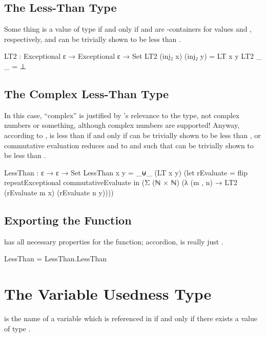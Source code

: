 \documentclass{report}
\begin{document}
\subsection{The  Less-Than Type}
Some thing is a value of type    if and only if  and  are -containers for values  and , respectively, and  can be trivially shown to be less than .

\begin{code}
  LT2 : Exceptional ε → Exceptional ε → Set
  LT2 (inj₂ x) (inj₂ y) = LT x y
  LT2 _ _ = ⊥
\end{code}

\subsection{The Complex Less-Than Type}
In this case, ``complex'' is justified by 's relevance to the type, not complex numbers or something, although complex numbers are supported!  Anyway, according to ,  is less than  if and only if  can be trivially shown to be less than , or commutative evaluation reduces  and  to  and  such that  can be trivially shown to be less than .

\begin{code}
  LessThan : ε → ε → Set
  LessThan x y =
    _⊎_ (LT x y)
        (let rEvaluate = flip repeatExceptional commutativeEvaluate in
         (Σ (ℕ × ℕ) (λ (m , n) → LT2 (rEvaluate m x) (rEvaluate n y))))
\end{code}

\subsection{Exporting the Function}
 has all necessary properties for the  function; accordion,  is really just .

\begin{code}
LessThan = LessThan.LessThan
\end{code}

\section{The Variable Usedness Type}
 is the name of a variable which is referenced in  if and only if there exists a value of type   .
\end{document}
